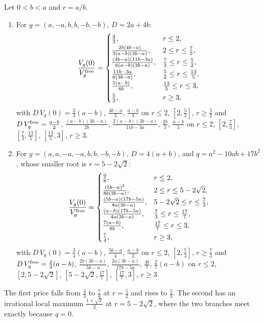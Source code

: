 \begin{theorem}
\label{thm:twomagprice}
Let $0<b<a$ and $r=a/b$.
\begin{enumerate}
\item For $g=(a,-a,b,b,-b,-b)$, $D=2a+4b$:
\[
\frac{V_g(0)}{V_g^{\rm free}}=
\begin{cases}
\frac43, & r\le2,\\[2pt]
\frac{2b(4b-a)}{3(a-b)(3b-a)}, & 2\le r\le\frac73,\\[2pt]
\frac{(4b-a)(11b-3a)}{6(a-b)(3b-a)}, & \frac73\le r\le\frac52,\\[2pt]
\frac{11b-3a}{6(3b-a)}, & \frac52\le r\le\frac{13}5,\\[2pt]
\frac{5(a-b)}{6b}, & \frac{13}5\le r\le3,\\[2pt]
\frac53, & r\ge3,
\end{cases}
\]
with $D\,V_g(0)=\frac23(a-b)$, $\frac{4b-a}3$, $\frac{a-b}3$ on $r\le2$, $[2,\frac52]$, $r\ge\frac52$ and
$D\,V_g^{\rm free}=\frac{a-b}2$, $\frac{(a-b)(3b-a)}{2b}$, $\frac{2(a-b)(3b-a)}{11b-3a}$, $\frac{2b}5$,
$\frac{a-b}5$ on $r\le2$, $[2,\frac73]$, $[\frac73,\frac{13}5]$, $[\frac{13}5,3]$, $r\ge3$.
\item For $g=(a,a,-a,-a,b,b,-b,-b)$, $D=4(a+b)$, and $q=a^2-10ab+17b^2$, whose smaller root is
$r=5-2\sqrt2$:
\[
\frac{V_g(0)}{V_g^{\rm free}}=
\begin{cases}
\frac98, & r\le2,\\[2pt]
\frac{(5b-a)^2}{8b(3b-a)}, & 2\le r\le5-2\sqrt2,\\[2pt]
\frac{(5b-a)(17b-5a)}{8a(3b-a)}, & 5-2\sqrt2\le r\le\frac73,\\[2pt]
\frac{(a-b)(17b-5a)}{4a(3b-a)}, & \frac73\le r\le\frac{17}7,\\[2pt]
\frac{7(a-b)}{8b}, & \frac{17}7\le r\le3,\\[2pt]
\frac74, & r\ge3,
\end{cases}
\]
with $D\,V_g(0)=\frac34(a-b)$, $\frac{5b-a}4$, $\frac{a-b}2$ on $r\le2$, $[2,\frac73]$, $r\ge\frac73$ and
$D\,V_g^{\rm free}=\frac23(a-b)$, $\frac{2b(3b-a)}{5b-a}$, $\frac{2a(3b-a)}{17b-5a}$, $\frac{4b}7$,
$\frac27(a-b)$ on $r\le2$, $[2,5-2\sqrt2]$, $[5-2\sqrt2,\frac{17}7]$, $[\frac{17}7,3]$, $r\ge3$.
\end{enumerate}
The first price falls from $\frac43$ to $\frac76$ at $r=\frac52$ and rises to $\frac53$. The second
has an irrational local maximum $\frac{1+\sqrt2}2$ at $r=5-2\sqrt2$, where the two branches meet
exactly because $q=0$.
\end{theorem}

